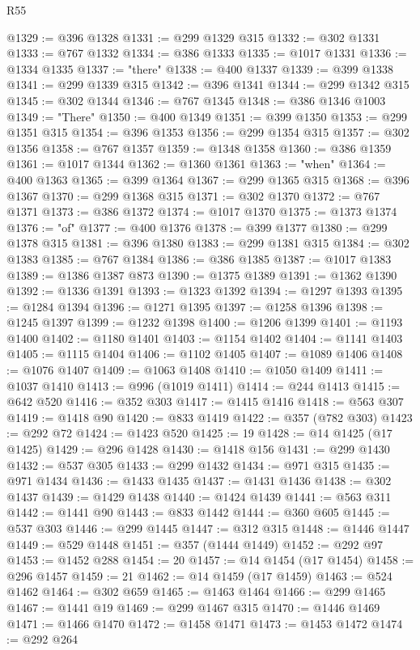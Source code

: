\begin{lexlean}{R55}
\begin{coremodule}
@1329 := @396 @1328
@1331 := @299 @1329 @315
@1332 := @302 @1331
@1333 := @767 @1332
@1334 := @386 @1333
@1335 := @1017 @1331
@1336 := @1334 @1335
@1337 := "there"
@1338 := @400 @1337
@1339 := @399 @1338
@1341 := @299 @1339 @315
@1342 := @396 @1341
@1344 := @299 @1342 @315
@1345 := @302 @1344
@1346 := @767 @1345
@1348 := @386 @1346 @1003
@1349 := "There"
@1350 := @400 @1349
@1351 := @399 @1350
@1353 := @299 @1351 @315
@1354 := @396 @1353
@1356 := @299 @1354 @315
@1357 := @302 @1356
@1358 := @767 @1357
@1359 := @1348 @1358
@1360 := @386 @1359
@1361 := @1017 @1344
@1362 := @1360 @1361
@1363 := "when"
@1364 := @400 @1363
@1365 := @399 @1364
@1367 := @299 @1365 @315
@1368 := @396 @1367
@1370 := @299 @1368 @315
@1371 := @302 @1370
@1372 := @767 @1371
@1373 := @386 @1372
@1374 := @1017 @1370
@1375 := @1373 @1374
@1376 := "of"
@1377 := @400 @1376
@1378 := @399 @1377
@1380 := @299 @1378 @315
@1381 := @396 @1380
@1383 := @299 @1381 @315
@1384 := @302 @1383
@1385 := @767 @1384
@1386 := @386 @1385
@1387 := @1017 @1383
@1389 := @1386 @1387 @873
@1390 := @1375 @1389
@1391 := @1362 @1390
@1392 := @1336 @1391
@1393 := @1323 @1392
@1394 := @1297 @1393
@1395 := @1284 @1394
@1396 := @1271 @1395
@1397 := @1258 @1396
@1398 := @1245 @1397
@1399 := @1232 @1398
@1400 := @1206 @1399
@1401 := @1193 @1400
@1402 := @1180 @1401
@1403 := @1154 @1402
@1404 := @1141 @1403
@1405 := @1115 @1404
@1406 := @1102 @1405
@1407 := @1089 @1406
@1408 := @1076 @1407
@1409 := @1063 @1408
@1410 := @1050 @1409
@1411 := @1037 @1410
@1413 := @996 (@1019 @1411)
@1414 := @244 @1413
@1415 := @642 @520
@1416 := @352 @303
@1417 := @1415 @1416
@1418 := @563 @307
@1419 := @1418 @90
@1420 := @833 @1419
@1422 := @357 (@782 @303)
@1423 := @292 @72
@1424 := @1423 @520
@1425 := 19
@1428 := @14 @1425 (@17 @1425)
@1429 := @296 @1428
@1430 := @1418 @156
@1431 := @299 @1430
@1432 := @537 @305
@1433 := @299 @1432
@1434 := @971 @315
@1435 := @971 @1434
@1436 := @1433 @1435
@1437 := @1431 @1436
@1438 := @302 @1437
@1439 := @1429 @1438
@1440 := @1424 @1439
@1441 := @563 @311
@1442 := @1441 @90
@1443 := @833 @1442
@1444 := @360 @605
@1445 := @537 @303
@1446 := @299 @1445
@1447 := @312 @315
@1448 := @1446 @1447
@1449 := @529 @1448
@1451 := @357 (@1444 @1449)
@1452 := @292 @97
@1453 := @1452 @288
@1454 := 20
@1457 := @14 @1454 (@17 @1454)
@1458 := @296 @1457
@1459 := 21
@1462 := @14 @1459 (@17 @1459)
@1463 := @524 @1462
@1464 := @302 @659
@1465 := @1463 @1464
@1466 := @299 @1465
@1467 := @1441 @19
@1469 := @299 @1467 @315
@1470 := @1446 @1469
@1471 := @1466 @1470
@1472 := @1458 @1471
@1473 := @1453 @1472
@1474 := @292 @264

\end{coremodule}
\end{lexlean}
